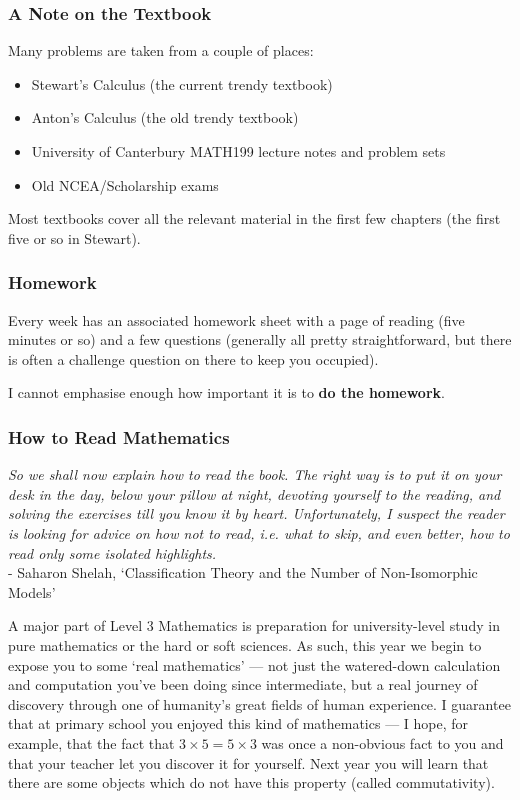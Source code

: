 \subsubsection*{A Note on the Textbook}
Many problems are taken from a couple of places:
\begin{itemize}
  \item Stewart's Calculus (the current trendy textbook)
  \item Anton's Calculus (the old trendy textbook)
  \item University of Canterbury MATH199 lecture notes and problem sets
  \item Old NCEA/Scholarship exams
\end{itemize}
Most textbooks cover all the relevant material in the first few chapters (the first five or so in Stewart).

\subsubsection*{Homework}
Every week has an associated homework sheet with a page of reading (five minutes or so) and a few questions (generally all
pretty straightforward, but there is often a challenge question on there to keep you occupied).

I cannot emphasise enough how important it is to \textbf{do the homework}.

\subsubsection*{How to Read Mathematics}
\begin{center}
  \textit{So we shall now explain how to read the book. The right way is to put it on your desk in the day, below your pillow at night, devoting yourself to the reading, and solving the exercises till you know it by heart. Unfortunately, I suspect the reader is looking for advice on how not to read, i.e. what to skip, and even better, how to read only some isolated highlights.}\\ - Saharon Shelah, `Classification Theory and the Number of Non-Isomorphic Models'
\end{center}

A major part of Level 3 Mathematics is preparation for university-level study in pure mathematics or the hard or soft sciences. As such, this
year we begin to expose you to some `real mathematics' --- not just the watered-down calculation and computation you've been doing since intermediate,
but a real journey of discovery through one of humanity's great fields of human experience. I guarantee that at primary school you enjoyed
this kind of mathematics --- I hope, for example, that the fact that $ 3 \times 5 = 5 \times 3 $ was once a non-obvious fact to you and that
your teacher let you discover it for yourself. Next year you will learn that there are some objects which do not have this property (called commutativity).


